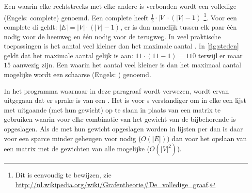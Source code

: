 Een  waarin elke  rechtstreeks met elke andere  is verbonden wordt een volledige (Engels: complete)  genoemd.
Een complete  heeft $\frac{1}{2}\cdot{}|V|\cdot{}(|V|-1)$ \footnote{%
	Dit is eenvoudig te bewijzen, zie \url{http://nl.wikipedia.org/wiki/Grafentheorie\#De\_volledige\_graaf}.
}.
Voor een complete di geldt: $|E|=|V|\cdot{}(|V|-1)$, er is dan namelijk tussen elk paar  één  nodig voor de heenweg en één  nodig voor de terugweg.
In veel praktische toepassingen is het aantal  veel kleiner dan het maximale aantal .
In \cref{fig:steden} geldt dat het maximale aantal  gelijk is aan: $11\cdot{}(11-1) = 110$ terwijl er maar $15$ aanwezig zijn.
Een  waarin het aantal  veel kleiner is dan het maximaal aantal mogelijke  wordt een schaarse (Engels: )  genoemd.

In het programma waarnaar in deze paragraaf wordt verwezen, wordt ervan uitgegaan dat er sprake is van een .
Het is voor s verstandiger om in elke  een lijst met uitgaande  (met hun gewicht) op te slaan in plaats van een matrix te gebruiken waarin voor elke combinatie van  het gewicht van de bijbehorende  is opgeslagen.
Als de  met hun gewicht opgeslagen worden in lijsten per  dan is daar voor een sparce  minder geheugen voor nodig ($O(|E|)$) dan voor het opslaan van een matrix met de gewichten van alle mogelijke  ($O(|V|^2)$).

